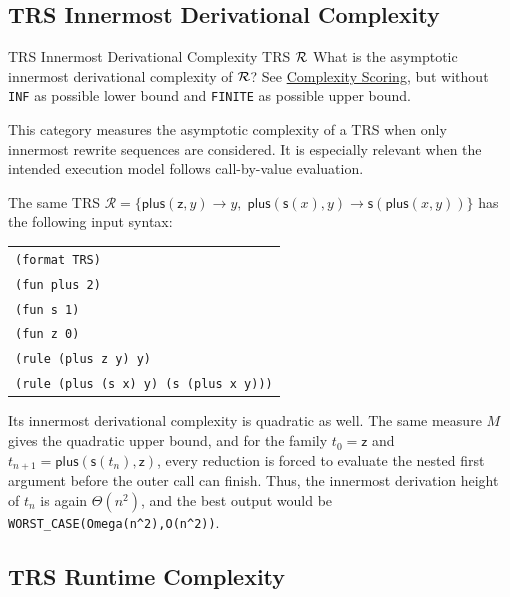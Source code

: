 \subsection{TRS Innermost Derivational Complexity}

\begin{formalproblem}
  {TRS Innermost Derivational Complexity}
  {TRS $\mathcal{R}$}
  {What is the asymptotic innermost derivational complexity of $\mathcal{R}$?}
  {See \hyperref[scoring_complexity]{Complexity Scoring}, but without \texttt{INF} as possible lower bound and \texttt{FINITE} as possible upper bound.}
\end{formalproblem}

\begin{motivation}
This category measures the asymptotic complexity of a TRS 
when only innermost rewrite sequences are considered.
It is especially relevant when the intended execution model follows call-by-value evaluation.
\end{motivation}

\begin{example}
The same TRS $\mathcal{R} = \{\mathsf{plus}(\mathsf{z}, y) \to y,\; 
\mathsf{plus}(\mathsf{s}(x), y) \to \mathsf{s}(\mathsf{plus}(x,y))\}$ has the following input syntax:
\begin{center}
\begin{tabular}{l}
\texttt{(format TRS)} \\
\texttt{(fun plus 2)} \\
\texttt{(fun s 1)} \\
\texttt{(fun z 0)} \\
\texttt{(rule (plus z y) y)} \\
\texttt{(rule (plus (s x) y) (s (plus x y)))}
\end{tabular}
\end{center}
Its innermost derivational complexity is quadratic as well. The same measure $M$ gives the quadratic upper bound, 
and for the family $t_0 = \mathsf{z}$ and $t_{n+1} = \mathsf{plus}(\mathsf{s}(t_n),\mathsf{z})$, 
every reduction is forced to evaluate the nested first argument before the outer call can finish. 
Thus, the innermost derivation height of $t_n$ is again $\Theta(n^2)$, 
and the best output would be \texttt{WORST\_CASE(Omega(n\^{}2),O(n\^{}2))}.
\end{example}

\subsection{TRS Runtime Complexity}

